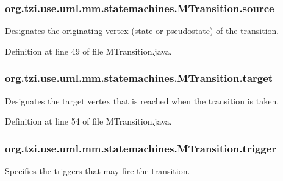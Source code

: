 \hypertarget{classorg_1_1tzi_1_1use_1_1uml_1_1mm_1_1statemachines_1_1_m_transition_a75e7dc92d45d783d8e0503e57c771133}{
\subsubsection[{source}]{ org.\-tzi.\-use.\-uml.\-mm.\-statemachines.\-M\-Transition.\-source\hspace{0.3cm}{\ttfamily [protected]}}}\label{classorg_1_1tzi_1_1use_1_1uml_1_1mm_1_1statemachines_1_1_m_transition_a75e7dc92d45d783d8e0503e57c771133}
Designates the originating vertex (state or pseudostate) of the transition. 

Definition at line 49 of file M\-Transition.\-java.

\hypertarget{classorg_1_1tzi_1_1use_1_1uml_1_1mm_1_1statemachines_1_1_m_transition_aaaa81e7ce0744826e2b8e81a364a51b5}{
\subsubsection[{target}]{ org.\-tzi.\-use.\-uml.\-mm.\-statemachines.\-M\-Transition.\-target\hspace{0.3cm}{\ttfamily [protected]}}}\label{classorg_1_1tzi_1_1use_1_1uml_1_1mm_1_1statemachines_1_1_m_transition_aaaa81e7ce0744826e2b8e81a364a51b5}
Designates the target vertex that is reached when the transition is taken. 

Definition at line 54 of file M\-Transition.\-java.

\hypertarget{classorg_1_1tzi_1_1use_1_1uml_1_1mm_1_1statemachines_1_1_m_transition_a2e4465cf1b947d667b48842d9879cc2d}{
\subsubsection[{trigger}]{ org.\-tzi.\-use.\-uml.\-mm.\-statemachines.\-M\-Transition.\-trigger\hspace{0.3cm}{\ttfamily [protected]}}}\label{classorg_1_1tzi_1_1use_1_1uml_1_1mm_1_1statemachines_1_1_m_transition_a2e4465cf1b947d667b48842d9879cc2d}
Specifies the triggers that may fire the transition. 

